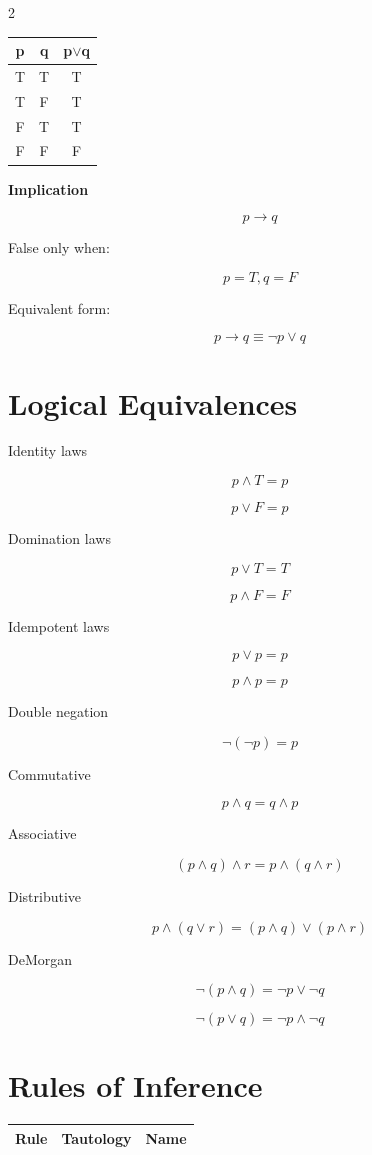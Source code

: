 \documentclass[9pt]{article}
\begin{document}
\begin{multicols}{2}
\begin{tabular}{c c | c}
p & q & p$\lor$q\\
\hline
T&T&T\\
T&F&T\\
F&T&T\\
F&F&F
\end{tabular}

\textbf{Implication}

\[
p \rightarrow q
\]

False only when:

\[
p=T, q=F
\]

Equivalent form:

\[
p\rightarrow q \equiv \neg p \lor q
\]

\section*{Logical Equivalences}

Identity laws

\[
p \land T = p
\]

\[
p \lor F = p
\]

Domination laws

\[
p \lor T = T
\]

\[
p \land F = F
\]

Idempotent laws

\[
p \lor p = p
\]

\[
p \land p = p
\]

Double negation

\[
\neg(\neg p)=p
\]

Commutative

\[
p\land q=q\land p
\]

Associative

\[
(p\land q)\land r=p\land(q\land r)
\]

Distributive

\[
p\land(q\lor r)=(p\land q)\lor(p\land r)
\]

DeMorgan

\[
\neg(p\land q)=\neg p\lor\neg q
\]

\[
\neg(p\lor q)=\neg p\land\neg q
\]

\section*{Rules of Inference}

\begin{tabular}{|c|c|c|}
\hline
Rule & Tautology & Name\\
\hline


\end{tabular}
\end{multicols}
\end{document}
